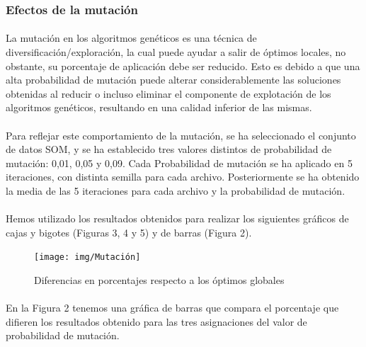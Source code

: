 	\subsubsection{Efectos de la mutación}
	
	\paragraph{} La mutación en los algoritmos genéticos es una técnica de diversificación/exploración, la cual puede ayudar a salir de óptimos locales, no obstante, su porcentaje de aplicación debe ser reducido. Esto es debido a que una alta probabilidad de mutación puede alterar considerablemente las soluciones obtenidas al reducir o incluso eliminar el componente de explotación de los algoritmos genéticos, resultando en una calidad inferior de las mismas.
	
	\paragraph{}Para reflejar este comportamiento de la mutación, se ha seleccionado el conjunto de datos SOM, y se ha establecido tres valores distintos de probabilidad de mutación: 0,01, 0,05 y 0,09. Cada Probabilidad de mutación se ha aplicado en 5 iteraciones, con distinta semilla para cada archivo. Posteriormente se ha obtenido la media de las 5 iteraciones para cada archivo y la probabilidad de mutación.
	
	\paragraph{}Hemos utilizado los resultados obtenidos para realizar los siguientes gráficos de cajas y bigotes (Figuras 3, 4 y 5) y de barras (Figura 2).
	
	\begin{figure}[H]
		
		\centering
		\texttt{[image: img/Mutación]}
		\caption{Diferencias en porcentajes respecto a los óptimos globales}
		
	\end{figure}

	\paragraph{}En la Figura 2 tenemos una gráfica de barras que compara el porcentaje que difieren los resultados obtenido para las tres asignaciones del valor de probabilidad de mutación.
	
